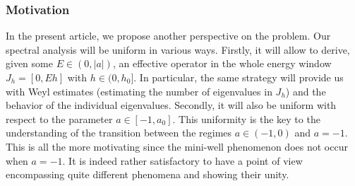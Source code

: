\documentclass[JEP,XML,SOM,Unicode,NoFloatCountersInSection,published]{cedram}
\theoremstyle{plain}
\theoremstyle{definition}
\begin{document}
\subsubsection{Motivation}
In the present article, we propose another perspective on the problem. Our spectral analysis will be uniform in various ways. Firstly, it will allow to derive, given some $E\in(0,|a|)$, an effective operator in the whole energy window $J_h=[0,Eh]$ with $h\in (0,h_0]$. In particular, the same strategy will provide us with Weyl estimates (estimating the number of eigenvalues in $J_h$) and the behavior of the individual eigenvalues. Secondly, it will also be uniform with respect to the parameter $a\in[-1,a_0]$. This uniformity is the key to the understanding of the transition between the regimes $a\in(-1,0)$ and $a=-1$. This is all the more motivating since the mini-well phenomenon does not occur when $a=-1$. It is indeed rather satisfactory to have a point of view encompassing quite different phenomena and showing their unity.
\end{document}
